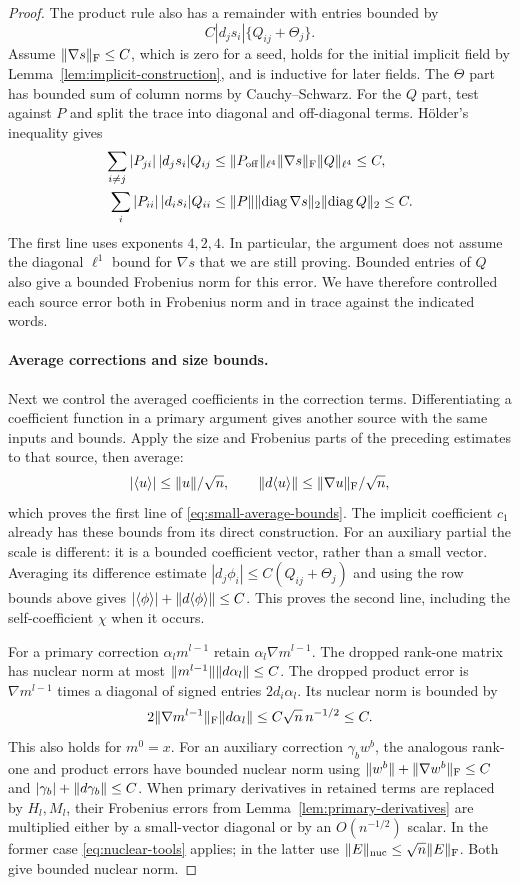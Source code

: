 \begin{proof}
The product rule also has a remainder with entries bounded by
\[
 C|d_js_i|\{Q_{ij}+\Theta_j\}.
\]
Assume $\lVert \nabla s\rVert_{\mathrm F}\leq C$, which is zero for a seed,
holds for the initial implicit field by
Lemma~\ref{lem:implicit-construction}, and is inductive for later fields.
The $\Theta$ part has bounded sum of column norms by Cauchy--Schwarz.
For the $Q$ part, test against $P$ and split the trace into diagonal and
off-diagonal terms.  H\"older's inequality gives
\begin{align*}
 \sum_{i\ne j}|P_{ji}|\,|d_js_i|Q_{ij}
 &\leq \lVert P_{\rm off}\rVert_{\ell^4}
       \lVert \nabla s\rVert_{\mathrm F}\lVert Q\rVert_{\ell^4}\leq C,\\
 \sum_i|P_{ii}|\,|d_is_i|Q_{ii}
 &\leq\lVert P\rVert\lVert \operatorname{diag}\nabla s\rVert_2\lVert \operatorname{diag} Q\rVert_2\leq C.
\end{align*}
The first line uses exponents $4,2,4$. In particular, the argument does
not assume the diagonal $\ell^1$ bound for $\nabla s$ that we are still
proving. Bounded entries of $Q$ also give a bounded Frobenius norm for
this error. We have therefore controlled each source error both in
Frobenius norm and in trace against the indicated words.

\paragraph{Average corrections and size bounds.}
Next we control the averaged coefficients in the correction terms.
Differentiating a coefficient function in a primary argument gives another
source with the same inputs and bounds. Apply the size and Frobenius
parts of the preceding estimates to that source, then average:
\[
 |\langle u\rangle|\leq\lVert u\rVert/\sqrt n,\qquad
 \lVert d\langle u\rangle\rVert\leq\lVert \nabla u\rVert_{\mathrm F}/\sqrt n,
\]
which proves the first line of \eqref{eq:small-average-bounds}.
The implicit coefficient $c_1$ already has these bounds from its direct
construction. For an auxiliary partial the scale is different: it is a
bounded coefficient vector, rather than a small vector. Averaging its
difference estimate
$|d_j\phi_i|\leq C(Q_{ij}+\Theta_j)$ and using the row bounds above
gives $|\langle \phi\rangle|+\lVert d\langle \phi\rangle\rVert\leq C$.  This proves the second
line, including the self-coefficient $\chi$ when it occurs.

For a primary correction $\alpha_lm^{l-1}$ retain
$\alpha_l\nabla m^{l-1}$.  The dropped rank-one matrix has nuclear norm
at most $\lVert m^{l-1}\rVert\lVert d\alpha_l\rVert\leq C$.  The dropped product
error is $\nabla m^{l-1}$ times a diagonal of signed entries
$2d_i\alpha_l$.  Its nuclear norm is bounded by
\[
 2\lVert \nabla m^{l-1}\rVert_{\mathrm F}\lVert d\alpha_l\rVert
 \leq C\sqrt n\,n^{-1/2}\leq C.
\]
This also holds for $m^0=x$.  For an auxiliary correction $\gamma_bw^b$,
the analogous rank-one and product errors have bounded nuclear norm using
$\lVert w^b\rVert+\lVert \nabla w^b\rVert_{\mathrm F}\leq C$ and
$|\gamma_b|+\lVert d\gamma_b\rVert\leq C$.
When primary derivatives in retained terms are replaced by
$H_l,M_l$, their Frobenius errors from
Lemma~\ref{lem:primary-derivatives} are multiplied either by a
small-vector diagonal or by an $O(n^{-1/2})$ scalar.  In the former case
\eqref{eq:nuclear-tools} applies; in the latter use
$\lVert E\rVert_{\rm nuc}\leq\sqrt n\lVert E\rVert_{\mathrm F}$.  Both give bounded
nuclear norm.


\end{proof}
